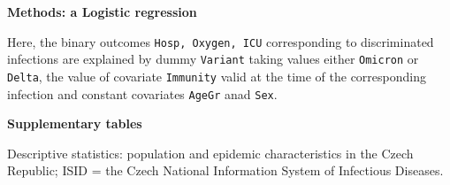 \documentclass[preprint,12pt,authoryear]{elsarticle}
\begin{document}
\noindent
{\bf Methods: a Logistic regression}

Here, the binary outcomes {\tt Hosp, Oxygen, ICU} corresponding to discriminated infections are explained by dummy {\tt Variant} taking values either {\tt Omicron} or {\tt Delta}, the value of covariate {\tt Immunity} valid at the time of the corresponding infection and constant covariates {\tt AgeGr} anad {\tt Sex}.

\clearpage
\newpage

\noindent
{\bf Supplementary tables}

\begin{sidewaystable}
[h]
\caption{Descriptive statistics: population and epidemic characteristics in the Czech Republic; ISID = the Czech National Information System of Infectious Diseases. \vspace{2mm}}



\end{sidewaystable}
\end{document}
